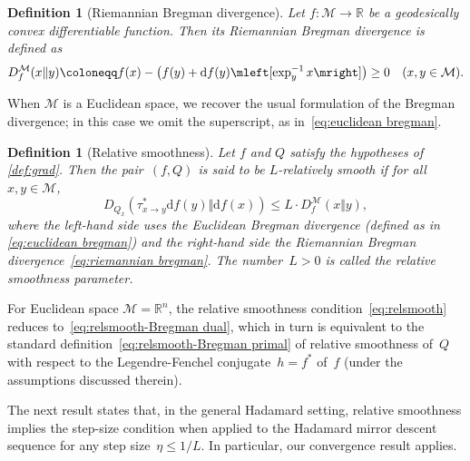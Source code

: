 \documentclass[11pt,letterpaper]{article}
\newtheorem{definition}[theorem]{Definition}\AddToHook{env/definition/begin}{\crefalias{theorem}{definition}}
\numberwithin{equation}{section}
\newcommand{\RR}{\mathbb{R}}
\newcommand{\diff}{\mathrm{d}}
\newcommand{\MM}{\mathcal{M}}
\begin{document}
\begin{definition}[Riemannian Bregman divergence]
    Let $f \colon \MM \to \RR$ be a geodesically convex differentiable function.
    Then its \emph{Riemannian Bregman divergence} is defined as
    \begin{equation}\label{eq:riemannian bregman}
        D_f^{\MM}(x\Vert y) \coloneqq f(x) - \left(f(y) + \diff f(y)\mleft[\exp_{y}^{-1}x\mright]\right) \geq 0 \quad (x, y \in \MM).
    \end{equation}
\end{definition}

When $\MM$ is a Euclidean space, we recover the usual formulation of the Bregman divergence;
in this case we omit the superscript, as in~\eqref{eq:euclidean bregman}.

\begin{definition}[Relative smoothness]
    Let $f$ and $Q$ satisfy the hypotheses of \cref{def:grad}.
    Then the pair~$(f, Q)$ is said to be \emph{$L$-relatively smooth} if for all~$x, y \in \MM$,
    \begin{equation}\label{eq:relsmooth}
        D_{Q_x}(\tau_{x \to y}^*\diff f(y)\Vert\diff f(x)) \leq L\cdot D_f^{\MM}(x\Vert y),
    \end{equation}
    where the left-hand side uses the Euclidean Bregman divergence (defined as in \eqref{eq:euclidean bregman}) and the right-hand side the Riemannian Bregman divergence~\eqref{eq:riemannian bregman}.
    The number~$L>0$ is called the relative smoothness parameter.
\end{definition}

For Euclidean space $\MM=\RR^n$, the relative smoothness condition~\eqref{eq:relsmooth} reduces to~\eqref{eq:relsmooth-Bregman dual}, which in turn is equivalent to the standard definition~\eqref{eq:relsmooth-Bregman primal} of relative smoothness of~$Q$ with respect to the Legendre-Fenchel conjugate~$h=f^\ast$ of~$f$ (under the assumptions discussed therein).

The next result states that, in the general Hadamard setting, relative smoothness implies the step-size condition when applied to the Hadamard mirror descent sequence for any step size~$\eta\leq1/L$.
In particular, our convergence result applies.
\end{document}
